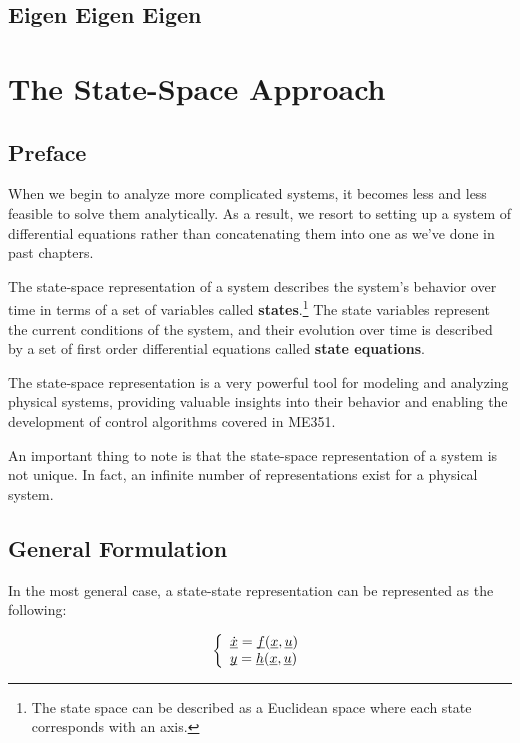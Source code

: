 \documentclass{report}
\begin{document}
\begin{onehalfspacing}
\begin{flushleft}
\section{Eigen Eigen Eigen}

\chapter{The State-Space Approach}

\section*{Preface}

When we begin to analyze more complicated systems, it becomes less and less feasible to solve them analytically. As a result, we resort to setting up a system of differential equations rather than concatenating them into one as we've done in past chapters.

\medskip

The state-space representation of a system describes the system's behavior over time in terms of a set of variables called \textbf{states}.\footnote{The state space can be described as a Euclidean space where each state corresponds with an axis.} The state variables represent the current conditions of the system, and their evolution over time is described by a set of first order differential equations called \textbf{state equations}.

\medskip

The state-space representation is a very powerful tool for modeling and analyzing physical systems, providing valuable insights into their behavior and enabling the development of control algorithms covered in ME351.

\medskip

An important thing to note is that the state-space representation of a system is not unique. In fact, an infinite number of representations exist for a physical system.

\section{General Formulation}

In the most general case, a state-state representation can be represented as the following:

\begin{equation*}
    \left\{ \begin{array}{ll}
        \underbar{\(\dot{x}\)} = \underbar{\(f\)}(\underbar{\(x\)}, \underbar{\(u\)}) \\
        \underbar{\(y\)} = \underbar{\(h\)}(\underbar{\(x\)}, \underbar{\(u\)})
    \end{array} \right.
\end{equation*}


\end{flushleft}
\end{onehalfspacing}
\end{document}
